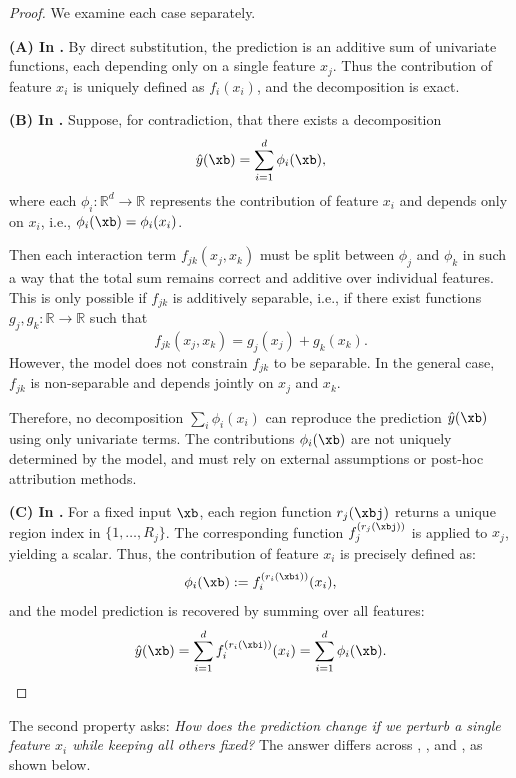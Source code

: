\begin{proof}
We examine each case separately.

\textbf{(A) In \gam.} By direct substitution, the prediction is an additive sum of univariate functions, each depending only on a single feature \( x_j \). Thus the contribution of feature \( x_i \) is uniquely defined as \( f_i(x_i) \), and the decomposition is exact. 

\textbf{(B) In \gamm.} Suppose, for contradiction, that there exists a decomposition
\[
\hat{y}(\xb) = \sum_{i=1}^d \phi_i(\xb),
\]
where each \( \phi_i : \mathbb{R}^d \to \mathbb{R} \) represents the contribution of feature \( x_i \) and depends only on \( x_i \), i.e., \( \phi_i(\xb) = \phi_i(x_i) \).

Then each interaction term \( f_{jk}(x_j, x_k) \) must be split between \( \phi_j \) and \( \phi_k \) in such a way that the total sum remains correct and additive over individual features. This is only possible if \( f_{jk} \) is additively separable, i.e., if there exist functions \( g_j, g_k : \mathbb{R} \to \mathbb{R} \) such that
\[
f_{jk}(x_j, x_k) = g_j(x_j) + g_k(x_k).
\]
However, the model does not constrain \( f_{jk} \) to be separable. In the general case, \( f_{jk} \) is non-separable and depends jointly on \( x_j \) and \( x_k \).

Therefore, no decomposition \( \sum_i \phi_i(x_i) \) can reproduce the prediction \( \hat{y}(\xb) \) using only univariate terms. The contributions \( \phi_i(\xb) \) are not uniquely determined by the model, and must rely on external assumptions or post-hoc attribution methods.

 \textbf{(C) In \method{}.} For a fixed input \( \xb \), each region function \( r_j(\xbj) \) returns a unique region index in \( \{1, \dots, R_j\} \). The corresponding function \( f_j^{(r_j(\xbj))} \) is applied to \( x_j \), yielding a scalar. Thus, the contribution of feature \( x_i \) is precisely defined as:
\[
\phi_i(\xb) := f_i^{(r_i(\xbi))}(x_i),
\]
and the model prediction is recovered by summing over all features:
\[
\hat{y}(\xb) = \sum_{i=1}^d f_i^{(r_i(\xbi))}(x_i) = \sum_{i=1}^d \phi_i(\xb). 
\]
\end{proof}

The second property asks: \emph{How does the prediction change if we perturb a single feature \( x_i \) while keeping all others fixed?} The answer differs across \gam, \gamm, and \method{}, as shown below.

